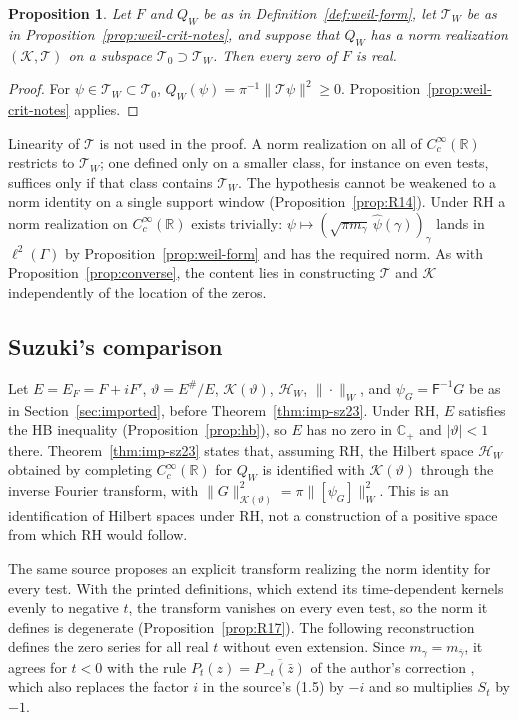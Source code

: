 \documentclass[11pt]{amsart}
\theoremstyle{plain}
\newtheorem{proposition}[theorem]{Proposition}
\theoremstyle{definition}
\theoremstyle{remark}
\numberwithin{equation}{section}
\newcommand{\R}{\mathbb{R}}
\newcommand{\Cp}{\mathbb{C}_{+}}
\begin{document}
\begin{proposition}\label{prop:weil-norm-converse}
Let $F$ and $Q_W$ be as in Definition~\ref{def:weil-form}, let
$\mathcal T_W$ be as in Proposition~\ref{prop:weil-crit-notes}, and
suppose that $Q_W$ has a norm realization $(\mathcal K,\mathcal T)$ on
a subspace $\mathcal T_0\supset\mathcal T_W$. Then every zero of $F$ is
real.
\end{proposition}

\begin{proof}
For $\psi\in\mathcal T_W\subset\mathcal T_0$,
$Q_W(\psi)=\pi^{-1}\|\mathcal T\psi\|^2\ge0$.
Proposition~\ref{prop:weil-crit-notes} applies.
\end{proof}

Linearity of $\mathcal T$ is not used in the proof. A norm realization
on all of $C_c^\infty(\R)$ restricts to $\mathcal T_W$; one defined
only on a smaller class, for instance on even tests, suffices only if
that class contains $\mathcal T_W$. The hypothesis cannot be weakened
to a norm identity on a single support window (Proposition~\ref{prop:R14}).
Under RH a norm realization on $C_c^\infty(\R)$ exists trivially:
$\psi\mapsto(\sqrt{\pi m_\gamma}\,\widehat\psi(\gamma))_\gamma$ lands in
$\ell^2(\Gamma)$ by Proposition~\ref{prop:weil-form} and has the
required norm. As with Proposition~\ref{prop:converse}, the content lies
in constructing $\mathcal T$ and $\mathcal K$ independently of the
location of the zeros.

\subsection{Suzuki's comparison}\label{subsec:suzuki}

Let $E=E_F=F+iF'$, $\vartheta=E^\#/E$, $\mathcal K(\vartheta)$,
$\mathcal H_W$, $\|\cdot\|_W$, and $\psi_G=\mathsf F^{-1}G$ be as in
Section~\ref{sec:imported}, before Theorem~\ref{thm:imp-sz23}.
Under RH, $E$ satisfies the HB inequality
(Proposition~\ref{prop:hb}), so $E$ has no zero in $\Cp$ and
$|\vartheta|<1$ there. Theorem~\ref{thm:imp-sz23}
\cite[Theorem~1.1]{Suzuki2023WeilHilbert} states that, assuming RH, the
Hilbert space $\mathcal H_W$ obtained by completing $C_c^\infty(\R)$
for $Q_W$ is identified with $\mathcal K(\vartheta)$ through the
inverse Fourier transform, with
$\|G\|_{\mathcal K(\vartheta)}^2=\pi\|[\psi_G]\|_W^2$. This is an
identification of Hilbert spaces under RH, not a construction of a
positive space from which RH would follow.

The same source proposes an explicit transform realizing the norm
identity for every test. With the printed definitions, which extend its
time-dependent kernels evenly to negative $t$, the transform vanishes on
every even test, so the norm it defines is degenerate
(Proposition~\ref{prop:R17}). The following reconstruction defines the
zero series for all real $t$ without even extension. Since
$m_\gamma=m_{\bar\gamma}$, it agrees for $t<0$ with the rule
$P_t(z)=\overline{P_{-t}(\bar z)}$ of the author's correction
\cite[p.~27]{Suzuki2026WeilScrew}, which also replaces the factor $i$
in the source's (1.5) by $-i$ and so multiplies $S_t$ by $-1$.
\end{document}
